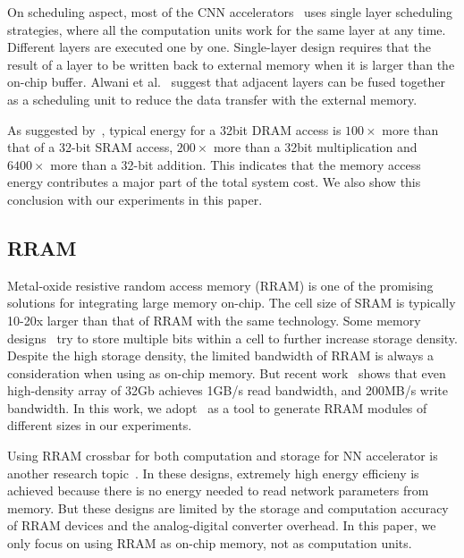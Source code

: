 On scheduling aspect, most of the CNN accelerators~\cite{zhang2015optimizing}\cite{qiu2016going}\cite{ma2017optimizing} uses single layer scheduling strategies, where all the computation units work for the same layer at any time. Different layers are executed one by one. Single-layer design requires that the result of a layer to be written back to external memory when it is larger than the on-chip buffer. Alwani et al.~\cite{alwani2016fused} suggest that adjacent layers can be fused together as a scheduling unit to reduce the data transfer with the external memory.

As suggested by~\cite{mac_energy}, typical energy for a 32bit DRAM access is $100\times$ more than that of a 32-bit SRAM access, $200\times$ more than a 32bit multiplication and $6400\times$ more than a 32-bit addition. This indicates that the memory access energy contributes a major part of the total system cost. We also show this conclusion with our experiments in this paper.

\subsection{RRAM}
Metal-oxide resistive random access memory (RRAM) is one of the promising solutions for integrating large memory on-chip. The cell size of SRAM is typically 10-20x larger than that of RRAM with the same technology. Some memory designs~\cite{chien2009multi, chien2011multi} try to store multiple bits within a cell to further increase storage density. Despite the high storage density, the limited bandwidth of RRAM is always a consideration when using as on-chip memory. But recent work~\cite{fackenthal201419} shows that even high-density array of 32Gb achieves 1GB/s read bandwidth, and 200MB/s write bandwidth. In this work, we adopt~\cite{dong2014nvsim} as a tool to generate RRAM modules of different sizes in our experiments.

Using RRAM crossbar for both computation and storage for NN accelerator is another research topic~\cite{chi2016prime}\cite{cheng2017time}\cite{xia2016switched}. In these designs, extremely high energy efficieny is achieved because there is no energy needed to read network parameters from memory. But these designs are limited by the storage and computation accuracy of RRAM devices and the analog-digital converter overhead. In this paper, we only focus on using RRAM as on-chip memory, not as computation units.